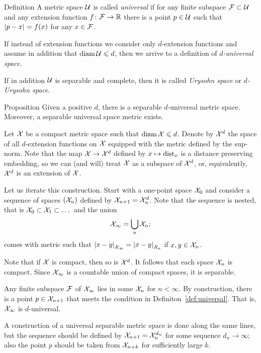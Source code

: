 \begin{thm}{Definition}\label{def:universal}
A metric space $\mathcal{U}$ is called \emph{universal}  if for any finite subspace $\mathcal{F}\subset\mathcal{U}$ and any extension function $f\colon\mathcal{F}\to\mathbb{R}$ there is a point $p\in \mathcal{U}$ such that $\dist{p}{x}{}=f(x)$ for any $x\in \mathcal{F}$.

If instead of extension functions we consider only $d$-extension functions and assume in addition that $\operatorname{\rm diam}\nolimits \mathcal{U}\leqslant d$, then we arrive to a definition of \emph{$d$-universal space}.

If in addition $\mathcal{U}$ is separable and complete, then it is called \emph{Urysohn space} or \emph{$d$-Urysohn space}.
\end{thm}


\begin{thm}{Proposition}\label{prop:univeral-separable}
Given a positive $d$, there is a separable $d$-universal metric space.
Moreover, a separable universal space metric exists.
\end{thm}

Let $\mathcal{X}$ be a compact metric space such that $\operatorname{\rm diam}\nolimits\mathcal{X}\leqslant d$.
Denote by $\mathcal{X}^d$ the space of all $d$-extension functions on $\mathcal{X}$ equipped with the metric defined by the sup-norm.
Note that the map $\mathcal{X} \to \mathcal{X}^d$ defined by $x\mapsto\mathrm{dist}_x$ is a distance preserving embedding,
so we can (and will) treat $\mathcal{X}$ as a subspace of $\mathcal{X}^d$, or, equivalently, $\mathcal{X}^d$ is an extension of $\mathcal{X}$.

Let us iterate this construction.
Start with a one-point space $\mathcal{X}_0$ and consider a sequence of spaces $(\mathcal{X}_n)$ defined by $\spc{X}_{n+1}\z=\spc{X}_n^d$.
Note that the sequence is nested, that is $\mathcal{X}_0\subset \mathcal{X}_1\subset\dots$
and the union
\[\mathcal{X}_\infty=\bigcup_n\mathcal{X}_n;\]
comes with metric such that
$\dist{x}{y}{\spc{X}_\infty} = \dist{x}{y}{\spc{X}_n}$
if $x,y\in\mathcal{X}_n$.

Note that if $\mathcal{X}$ is compact, then so is $\mathcal{X}^d$.
It follows that each space $\mathcal{X}_n$ is compact.
Since $\mathcal{X}_\infty$ is a countable union of compact spaces, it is separable.

Any finite subspace $\mathcal{F}$ of $\mathcal{X}_\infty$ lies in some $\mathcal{X}_n$ for $n<\infty$.
By construction, there is a point $p\in \mathcal{X}_{n+1}$ that meets the condition in Definiton~\ref{def:universal}.
That is, $\mathcal{X}_\infty$ is $d$-universal.

A construction of a universal separable metric space is done along the same lines, but the sequence should be defined by $\spc{X}_{n+1}\z=\spc{X}_n^{d_n}$ for some sequence $d_n\to\infty$;
also the point $p$ should be taken from $\mathcal{X}_{n+k}$ for sufficiently large $k$.
\qeds

